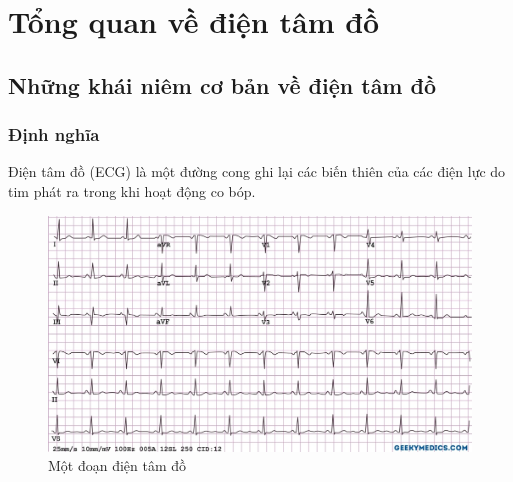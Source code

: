 \chapter{Tổng quan về điện tâm đồ}
\newpage


\section{Những khái niêm cơ bản về điện tâm đồ}
\subsection{Định nghĩa}
Điện tâm đồ (ECG) là một đường cong ghi lại các biến thiên của các điện lực do tim phát ra trong
khi hoạt động co bóp.
\begin{center}
    \begin{figure}[htp]
    \begin{center}
     \includegraphics[scale=.4]{image/chapter1/Normal-ECG-SCALED-DOWN-WATERMARK.jpg}
    \end{center}
    \caption{Một đoạn điện tâm đồ }
    \end{figure}
\end{center}


